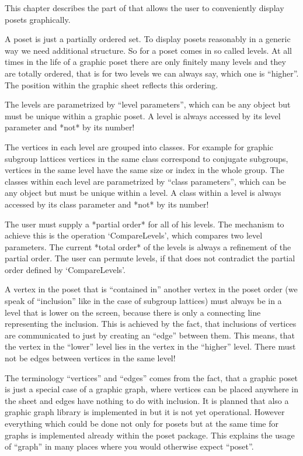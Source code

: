 
This chapter describes the part of {\XGAP} that allows the user to
conveniently display posets graphically.


A poset is just a partially ordered set. To display posets
reasonably in a generic way we need additional structure. So for {\XGAP} a
poset comes in so called levels. At all times in the life of a graphic
poset there are only finitely many levels and they are totally ordered,
that is for two levels we can always say, which one is ``higher''. The
position within the graphic sheet reflects this ordering.

The levels are parametrized by ``level parameters'', which can be any
{\GAP} object but must be unique within a graphic poset. A level is always
accessed by its level parameter and *not* by its number!

The vertices in each level are grouped into classes. For example for 
graphic subgroup lattices vertices in the same class correspond to conjugate
subgroups, vertices in the same level have the same size or index in the
whole group. The classes within each level are parametrized by ``class
parameters'', which can be any {\GAP} object but must be unique within a
level. A class within a level is always accessed by its class parameter and 
*not* by its number!

The user must supply a *partial order* for all of his levels. The mechanism 
to achieve this is the operation `CompareLevels', which compares two level
parameters. The current *total order* of the levels is always a refinement
of the partial order. The user can permute levels, if that does not
contradict the partial order defined by `CompareLevels'.

A vertex in the poset that is ``contained in'' another vertex in the poset
order (we speak of ``inclusion'' like in the case of subgroup lattices)
must always be in a level that is lower on the screen, because there 
is only a connecting line representing the inclusion. This is achieved by
the fact, that inclusions of vertices are communicated to {\XGAP} just by
creating an ``edge'' between them. This means, that the vertex in the
``lower'' level lies in the vertex in the ``higher'' level. There must not
be edges between vertices in the same level!

The terminology ``vertices'' and ``edges'' comes from the fact, that a
graphic poset is just a special case of a graphic graph, where vertices can 
be placed anywhere in the sheet and edges have nothing to do with
inclusion. It is planned that also a graphic graph library is implemented
in {\XGAP} but it is not yet operational. However everything which could be 
done not only for posets but at the same time for graphs is implemented
already within the poset package. This explains the usage of ``graph'' in
many places where you would otherwise expect ``poset''.

